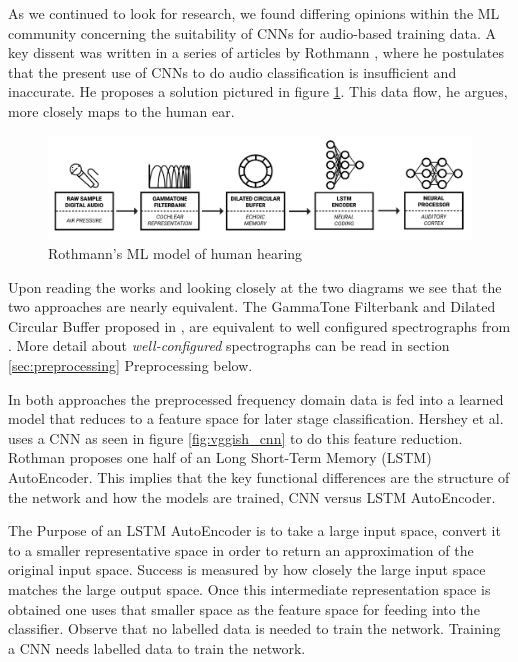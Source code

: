 \documentclass{article}
\begin{document}
As we continued to look for research, we found differing opinions within the ML community concerning the suitability of CNNs for audio-based training data.  A key dissent was written in a series of articles by Rothmann \cite{rothmann}, where he postulates that the present use of CNNs to do audio classification is insufficient and inaccurate.  He proposes a solution pictured in figure \ref{fig:rothman_flow}.   This data flow, he argues, more closely maps to the human ear.  

\begin{figure}[!htb]
	\centering
	\includegraphics[width=1.0\textwidth]{Rothmann_Flow.png}  
	\caption{Rothmann's	\cite{rothmann} ML model of human hearing}
	\label{fig:rothman_flow}
\end{figure}

Upon reading the works and looking closely at the two diagrams we see that the two approaches are nearly equivalent.  The GammaTone Filterbank and Dilated Circular Buffer proposed in \cite{rothmann}, are equivalent to well configured spectrographs from \cite{hershey}. More detail about \textit{well-configured} spectrographs can be read in section \ref{sec:preprocessing} Preprocessing below.  

In both approaches the preprocessed frequency domain data is fed into a learned model that reduces to a feature space for later stage classification.  Hershey et al.\cite{hershey} uses a CNN as seen in figure \ref{fig:vggish_cnn} to do this feature reduction.  Rothman \cite{rothmann} proposes one half of an Long Short-Term Memory (LSTM) AutoEncoder.  This implies that the key functional differences are the structure of the network and how the models are trained, CNN versus LSTM AutoEncoder.

The Purpose of an LSTM AutoEncoder is to take a large input space, convert it to a smaller representative space in order to return an approximation of the original input space.  Success is measured by how closely the large input space matches the large output space.  Once this intermediate representation space is obtained one uses that smaller space as the feature space for feeding into the classifier. Observe that no labelled data is needed to train the network.
Training a CNN needs labelled data to train the network.
\end{document}
